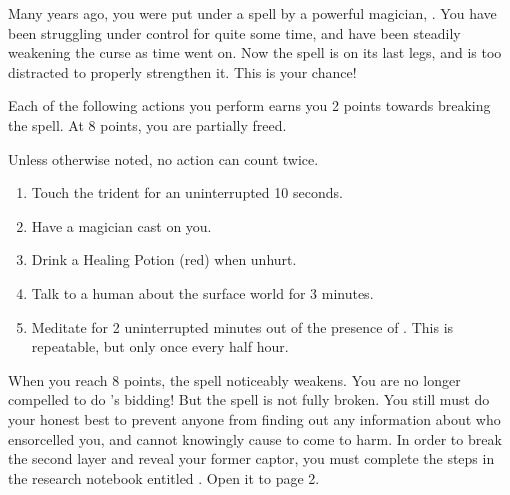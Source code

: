 \documentclass[green]{NeptuneBall}
\begin{document}
\name{\gSpellBreak{}}

Many years ago, you were put under a spell by a powerful magician, \cWitch{}. You have been struggling under \cWitch{\his} control for quite some time, and have been steadily weakening the curse as time went on. Now the spell is on its last legs, and \cWitch{} is too distracted to properly strengthen it. This is your chance!

Each of the following actions you perform earns you 2 points towards breaking the spell. At 8 points, you are partially freed. 

Unless otherwise noted, no action can count twice.

\begin{enumerate}
\item Touch the trident for an uninterrupted 10 seconds.
\item Have a magician cast \aLesserDispel{} on you.
\item Drink a Healing Potion (red) when unhurt.
\item Talk to a human about the surface world for 3 minutes.
\item Meditate for 2 uninterrupted minutes out of the presence of \cWitch{}. This is repeatable, but only once every half hour.
\end{enumerate}

When you reach 8 points, the spell noticeably weakens. You are no longer compelled to do \cWitch{}'s bidding! But the spell is not fully broken. You still must do your honest best to prevent anyone from finding out any information about who ensorcelled you, and cannot knowingly cause \cWitch{\him} to come to harm. In order to break the second layer and reveal your former captor, you must complete the steps in the research notebook entitled \nSpellBreakNotebook{}. Open it to page 2.
\end{document}
